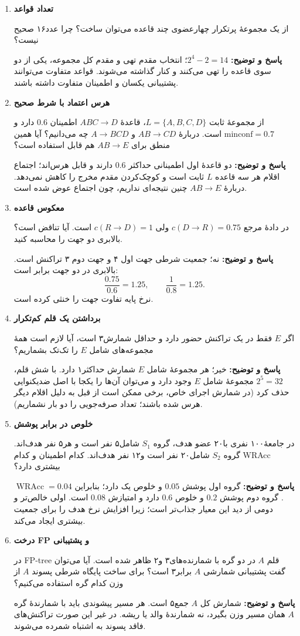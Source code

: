 \documentclass[12pt,a4paper,oneside]{report}
\newcounter{ex}[chapter]
\newenvironment{selftests}{\begin{enumerate}\setlength{\itemsep}{9pt}}{\end{enumerate}}
\newenvironment{selftest}[1]{\item\textbf{#1}\par}{\par}
\newcommand{\answer}[1]{\par{\color{teal}\bfseries پاسخ و توضیح: }#1\par}
\begin{document}
\begin{selftests}
\begin{selftest}{تعداد قواعد}
از یک مجموعهٔ پرتکرار چهارعضوی چند قاعده می‌توان ساخت؟ چرا عدد۱۶ صحیح نیست؟
\answer{$2^4-2=14$؛ انتخاب مقدم تهی و مقدم کل مجموعه، یکی از دو سوی قاعده را تهی می‌کنند و کنار گذاشته می‌شوند. قواعد متفاوت می‌توانند پشتیبانی یکسان و اطمینان متفاوت داشته باشند.}
\end{selftest}

\begin{selftest}{هرس اعتماد با شرط صحیح}
از مجموعهٔ ثابت $L=\{A,B,C,D\}$، قاعدهٔ $ABC\to D$ اطمینان $0.6$ دارد و $\mathrm{minconf}=0.7$ است. دربارهٔ $AB\to CD$ و $A\to BCD$ چه می‌دانیم؟ آیا همین منطق برای $AB\to E$ هم قابل استفاده است؟
\answer{دو قاعدهٔ اول اطمینانی حداکثر $0.6$ دارند و قابل هرس‌اند؛ اجتماع اقلام هر سه قاعده $L$ ثابت است و کوچک‌کردن مقدم مخرج را کاهش نمی‌دهد. دربارهٔ $AB\to E$ چنین نتیجه‌ای نداریم، چون اجتماع عوض شده است.}
\end{selftest}

\begin{selftest}{معکوس قاعده}
در دادهٔ مرجع $c(D\to R)=0.75$ ولی $c(R\to D)=1$ است. آیا تناقض است؟ بالابری دو جهت را محاسبه کنید.
\answer{نه؛ جمعیت شرطی جهت اول ۴ و جهت دوم ۳ تراکنش است. بالابری در دو جهت برابر است:
\[\frac{0.75}{0.6}=1.25,\qquad\frac{1}{0.8}=1.25.\]
نرخ پایه تفاوت جهت را خنثی کرده است.}
\end{selftest}

\begin{selftest}{برداشتن یک قلم کم‌تکرار}
اگر $E$ فقط در یک تراکنش حضور دارد و حداقل شمارش۳ است، آیا لازم است همهٔ مجموعه‌های شامل $E$ را تک‌تک بشماریم؟
\answer{خیر؛ هر مجموعهٔ شامل $E$ شمارش حداکثر۱ دارد. با شش قلم، $2^5=32$ مجموعهٔ شامل $E$ وجود دارد و می‌توان آن‌ها را یکجا با اصل ضدیکنوایی حذف کرد (در شمارش اجرای خاص، برخی ممکن است از قبل به دلیل اقلام دیگر هرس شده باشند؛ تعداد صرفه‌جویی را دو بار نشماریم).}
\end{selftest}

\begin{selftest}{خلوص در برابر پوشش}
در جامعهٔ۱۰۰ نفری با۲۰ عضو هدف، گروه $S_1$ شامل۵ نفر است و هر۵ نفر هدف‌اند. گروه $S_2$ شامل۲۰ نفر است و۱۲ نفر هدف‌اند. کدام اطمینان و کدام WRAcc بیشتری دارد؟
\answer{گروه اول پوشش $0.05$ و خلوص یک دارد؛ بنابراین $\operatorname{WRAcc}=0.04$. گروه دوم پوشش $0.2$ و خلوص $0.6$ دارد و امتیازش $0.08$ است. اولی خالص‌تر و دومی از دید این معیار جذاب‌تر است؛ زیرا افزایش نرخ هدف را برای جمعیت بیشتری ایجاد می‌کند.}
\end{selftest}

\begin{selftest}{درخت FP و پشتیبانی}
در FP-tree قلم $A$ در دو گره با شمارنده‌های۳ و۲ ظاهر شده است. آیا می‌توان گفت پشتیبانی شمارشی $A$ برابر۳ است؟ برای ساخت پایگاه شرطی پسوند $A$ از وزن کدام گره استفاده می‌کنیم؟
\answer{شمارش کل $A$ جمع۵ است. هر مسیر پیشوندی باید با شمارندهٔ گره $A$ همان مسیر وزن بگیرد، نه شمارندهٔ والد یا ریشه. در غیر این صورت تراکنش‌های فاقد پسوند به اشتباه شمرده می‌شوند.}
\end{selftest}


\end{selftests}
\end{document}
